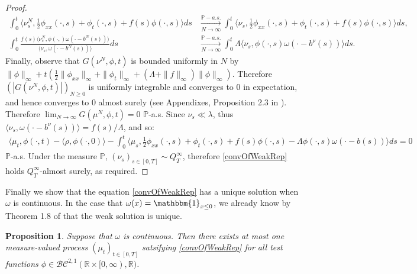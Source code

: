 \documentclass{article}
\newtheorem{propn}[theorem]{Proposition}
\newcommand{\B}[1]{\mathbb{#1}}
\newcommand{\C}[1]{\mathcal{#1}}
\newcommand{\is}{\mathbbm{1}}
\begin{document}
\begin{proof}
    \begin{align*}
    \int_0^t \langle \nu_s^N, \frac12 \phi_{xx}(\cdot,s)+\phi_t(\cdot,s)+f(s)\phi(\cdot,s)\rangle ds &\xrightarrow[N\to\infty]{\B{P}-a.s.}\int_0^t \langle \nu_s, \frac12 \phi_{xx}(\cdot,s)+\phi_t(\cdot,s)+f(s)\phi(\cdot,s)\rangle ds,\\
    \int_0^t \frac{f(s)\langle \nu_s^N, \phi(\cdot,)\omega(\cdot-b^N(s))\rangle}{\langle \nu_s,\omega(\cdot-b^N(s))\rangle}ds &\xrightarrow[N\to\infty]{\B{P}-a.s.}\int_0^t \Lambda \langle \nu_s,\phi(\cdot,s)\omega(\cdot-b^\nu(s))\rangle ds.\end{align*}
    Finally, observe that $G(\nu^N,\phi,t)$ is bounded uniformly in $N$ by $\|\phi\|_\infty + t(\frac12\|\phi_{xx}\|_\infty+\|\phi_t\|_\infty+(\Lambda+\|f\|_\infty)\|\phi\|_\infty)$. Therefore $(|G(\nu^N,\phi,t)|)_{N\geq 0}$ is uniformly integrable and converges to $0$ in expectation, and hence converges to $0$ almost surely (see Appendixes, Proposition 2.3 in \cite{ethierKurtz}). Therefore $\lim_{N\to\infty}G(\mu^N,\phi,t)=0$ $\B{P}$-a.s. Since $\nu_s\ll\lambda$, thus $\langle \nu_s,\omega(\cdot-b^\nu(s))\rangle = f(s)/\Lambda$, and so:
    \begin{align*}
        \langle \mu_t,\phi(\cdot,t)-\langle \rho,\phi(\cdot,0)\rangle - \int_0^t \langle \mu_s,\frac12\phi_{xx}(\cdot,s)+\phi_t(\cdot,s)+f(s)\phi(\cdot,s)-\Lambda \phi(\cdot,s)\omega(\cdot-b(s))\rangle ds=0
    \end{align*}
    $\B{P}$-a.s. Under the measure $\B{P}$, $(\nu_s)_{s\in [0,T]}\sim Q_T^\infty$, therefore \eqref{convOfWeakRep} holds $Q_T^\infty$-almost surely, as required. 
\end{proof}

Finally we show that the equation \eqref{convOfWeakRep} has a unique solution when $\omega$ is continuous. In the case that $\omega(x)=\is_{x\leq 0}$, we already know by Theorem 1.8 of \cite{ettingerHeningEvans} that the weak solution is unique. 

\begin{propn} \label{uniquenessOmegaCts}
    Suppose that $\omega$ is continuous. Then there exists at most one measure-valued process $(\mu_t)_{t\in [0,T]}$ satsifying \eqref{convOfWeakRep} for all test functions $\phi\in \C{BC}^{2,1}(\B{R}\times [0,\infty),\B{R})$.
\end{propn}
\end{document}
